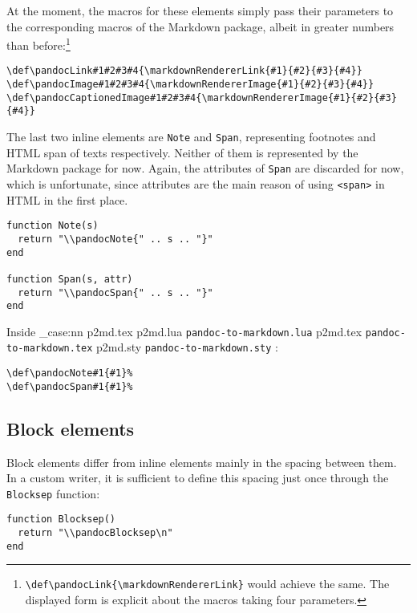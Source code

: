 \documentclass[
  digital,     %
  oneside,     %
  nosansbold,  %
  nocolorbold, %
  lof,         %
  nolot,       %
]{fithesis4}
\newcommand\macro[1]{\texttt{\textbackslash{}{#1}}}
\newcommand\file[1]
  {
    \str_case:nn
      { #1 }
      {
        { p2md.lua } { \texttt{pandoc\hyp{}to\hyp{}markdown.lua} }
        { p2md.tex } { \texttt{pandoc\hyp{}to\hyp{}markdown.tex} }
        { p2md.sty } { \texttt{pandoc\hyp{}to\hyp{}markdown.sty} }
      }
  }
\begin{document}
\noindent
At the moment, the macros for these elements simply pass their parameters to the corresponding macros of the Markdown package, albeit in greater numbers than before:\footnote{
\texttt{\macro{def}\macro{pandocLink}\{\macro{markdownRendererLink}\}}
would achieve the same. The displayed form is explicit about the macros taking four parameters.
}

\noindent
\lstset{language=[plain]TeX}
\begin{lstlisting}
\def\pandocLink#1#2#3#4{\markdownRendererLink{#1}{#2}{#3}{#4}}
\def\pandocImage#1#2#3#4{\markdownRendererImage{#1}{#2}{#3}{#4}}
\def\pandocCaptionedImage#1#2#3#4{\markdownRendererImage{#1}{#2}{#3}{#4}}
\end{lstlisting}

\noindent
The last two inline elements are \texttt{Note} and \texttt{Span}, representing footnotes and HTML span of texts respectively. Neither of them is represented by the Markdown package for now. Again, the attributes of \texttt{Span} are discarded for now, which is unfortunate, since attributes are the main reason of using \texttt{<span>} in HTML in the first place.

\noindent
\lstset{language=[5.3]Lua}
\begin{lstlisting}
function Note(s)
  return "\\pandocNote{" .. s .. "}"
end

function Span(s, attr)
  return "\\pandocSpan{" .. s .. "}"
end
\end{lstlisting}

\noindent
Inside \file{p2md.tex}:

\noindent
\lstset{language=[plain]TeX}
\begin{lstlisting}
\def\pandocNote#1{#1}%
\def\pandocSpan#1{#1}%
\end{lstlisting}

\subsection{Block elements}

Block elements differ from inline elements mainly in the spacing between them. In a custom writer, it is sufficient to define this spacing just once through the \texttt{Blocksep} function:

\noindent
\lstset{language=[5.3]Lua}
\begin{lstlisting}
function Blocksep()
  return "\\pandocBlocksep\n"
end
\end{lstlisting}
\end{document}

